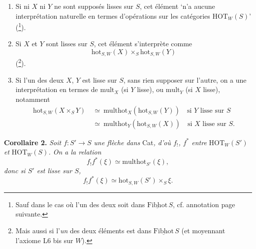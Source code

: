 \documentclass[11pt]{article}
\newcommand{\msp}[1]{\marginpar{\footnotesize [#1]}}
\newcommand{\HOT}{\mathrm{HOT}}
\newcommand{\hot}{\mathrm{hot}}
\newcommand{\multhot}{\mathrm{multhot}}
\newcommand{\mult}{\mathrm{mult}}
\begin{document}
\begin{enumerate}
\item[a)] Si ni $X$ ni $Y$ ne sont supposés lisses sur $S$, cet élément ‘n'a aucune interprétation naturelle en termes d'opérations sur les catégories $\HOT_W(S)$’ (\footnote[74]{Sauf dans le cas où l'un des deux soit dans $\underline{\mathrm{Fibhot}}\,S$, cf. annotation page suivante.}).

\msp{156}

\item[b)] Si $X$ et $Y$ sont lisses sur $S$, cet élément s'interprète comme
\[\hot_{S,W}(X)\times_S\hot_{S,W}(Y)\]
(\footnote[75]{Mais aussi si l'\textit{un} des deux éléments est dans $\underline{\mathrm{Fibhot}}\,S$ (et moyennant l'axiome L6 bis sur $W$).}).

\item[c)] Si l'un des deux $X$, $Y$ est lisse sur $S$, sans rien supposer sur l'autre, on a une interprétation en termes de $\mult_X$ (si $Y$ lisse), ou $\mult_Y$ (si $X$ lisse), notamment
\[\begin{aligned}
\hot_{S,W}(X\times_S Y)\ &\simeq\ \multhot_X(\hot_{S,W}(Y))\quad\text{si $Y$ lisse sur $S$}\\
&\simeq\ \multhot_Y(\hot_{S,W}(X))\quad\text{si $X$ lisse sur $S$.}
\end{aligned}\]
\end{enumerate}

\textbf{Corollaire 2.} \textit{Soit $f : S'\longrightarrow S$ une flèche dans} Cat\textit{, d'où $f_!$, $f^*$ entre} $\HOT_W(S')$ \textit{et} $\HOT_W(S)$\textit{. On a la relation}
\[f_!f^*(\xi)\simeq\multhot_{S'}(\xi),\]
\textit{donc si $S'$ est lisse sur $S$,}
\[f_!f^*(\xi)\simeq\hot_{S,W}(S')\times_S\xi.\]
\end{document}
